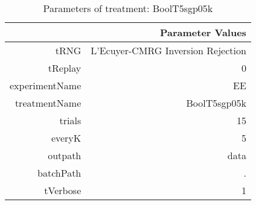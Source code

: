 \begin{table}[ht]
\centering
\begin{tabular}{rr}
  \hline
 & Parameter Values \\ 
  \hline
tRNG & L'Ecuyer-CMRG Inversion Rejection \\ 
  tReplay & 0 \\ 
  experimentName & EE \\ 
  treatmentName & BoolT5sgp05k \\ 
  trials & 15 \\ 
  everyK & 5 \\ 
  outpath & data \\ 
  batchPath & . \\ 
  tVerbose & 1 \\ 
   \hline
\end{tabular}
\caption{ Parameters of treatment: BoolT5sgp05k 
} 
\end{table}
